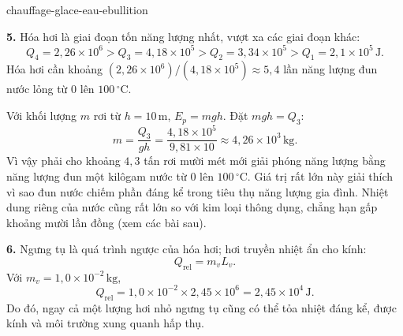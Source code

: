 \begin{exo}{chauffage-glace-eau-ebullition}
\begin{solution}
\textbf{5.} Hóa hơi là giai đoạn tốn năng lượng nhất, vượt xa các giai đoạn khác:
\[
Q_4=2{,}26\times10^6>Q_3=4{,}18\times10^5>Q_2=3{,}34\times10^5>Q_1=2{,}1\times10^5\,\text{J}.
\]
Hóa hơi cần khoảng $(2{,}26\times10^6)/(4{,}18\times10^5)\approx5{,}4$ lần năng lượng đun nước lỏng từ $0$ lên $100\,{}^\circ\text{C}$.

Với khối lượng $m$ rơi từ $h=10\,\text{m}$, $E_p=mgh$. Đặt $mgh=Q_3$:
\[
m=\frac{Q_3}{gh}=\frac{4{,}18\times10^5}{9{,}81\times10}
\approx4{,}26\times10^3\,\text{kg}.
\]
Vì vậy phải cho khoảng $4{,}3$ tấn rơi mười mét mới giải phóng năng lượng bằng năng lượng đun một kilôgam nước từ $0$ lên $100\,{}^\circ\text{C}$. Giá trị rất lớn này giải thích vì sao đun nước chiếm phần đáng kể trong tiêu thụ năng lượng gia đình. Nhiệt dung riêng của nước cũng rất lớn so với kim loại thông dụng, chẳng hạn gấp khoảng mười lần đồng (xem các bài sau).

\textbf{6.} Ngưng tụ là quá trình ngược của hóa hơi; hơi truyền nhiệt ẩn cho kính:
\[
Q_{\text{rel}}=m_vL_v.
\]
Với $m_v=1{,}0\times10^{-2}\,\text{kg}$,
\[
Q_{\text{rel}}=1{,}0\times10^{-2}\times2{,}45\times10^6
=2{,}45\times10^4\,\text{J}.
\]
Do đó, ngay cả một lượng hơi nhỏ ngưng tụ cũng có thể tỏa nhiệt đáng kể, được kính và môi trường xung quanh hấp thụ.
\end{solution}
\end{exo}

